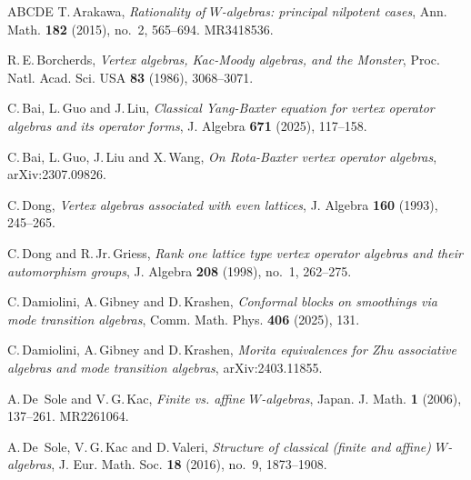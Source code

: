 \documentclass[12pt,a4paper,reqno]{amsart}
\numberwithin{equation}{section}
\numberwithin{equation}{section}
\theoremstyle{definition}
\begin{document}
		
		
		
		
		
		
		
		
		
		
		
		\begin{thebibliography}{ABCDE}
	T.\,Arakawa,
	{\em Rationality of $W$-algebras: principal nilpotent cases},
	Ann. Math. \textbf{182} (2015), no.~2, 565--694. MR3418536.
	
	R.\,E.\,Borcherds,
	{\em Vertex algebras, Kac-Moody algebras, and the Monster},
	Proc. Natl. Acad. Sci. USA \textbf{83} (1986), 3068--3071.
	
	C.\,Bai, L.\,Guo and J.\,Liu,
	{\em Classical Yang-Baxter equation for vertex operator algebras and its operator forms},
	J. Algebra \textbf{671} (2025), 117--158.
	
	C.\,Bai, L.\,Guo, J.\,Liu and X.\,Wang,
	{\em On Rota-Baxter vertex operator algebras},
	arXiv:2307.09826.
	
	C.\,Dong,
	{\em Vertex algebras associated with even lattices},
	J. Algebra \textbf{160} (1993), 245--265.
	
	C.\,Dong and R.\,Jr.\,Griess,
	{\em Rank one lattice type vertex operator algebras and their automorphism groups},
	J. Algebra \textbf{208} (1998), no.~1, 262--275.
	
	
	C.\,Damiolini, A.\,Gibney and D.\,Krashen,
	{\em Conformal blocks on smoothings via mode transition algebras},
	Comm. Math. Phys. \textbf{406} (2025), 131.
	
	C.\,Damiolini, A.\,Gibney and D.\,Krashen,
	{\em Morita equivalences for Zhu associative algebras and mode transition algebras},
	arXiv:2403.11855.
	
	A.\,De~Sole and V.\,G.\,Kac,
	{\em Finite vs. affine $W$-algebras},
	Japan. J. Math. \textbf{1} (2006), 137--261. MR2261064.
	
	A.\,De~Sole, V.\,G.\,Kac and D.\,Valeri,
	{\em Structure of classical (finite and affine) $W$-algebras},
	J. Eur. Math. Soc. \textbf{18} (2016), no.~9, 1873--1908.
	

\end{thebibliography}
\end{document}
